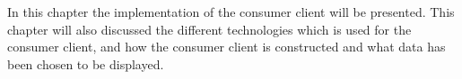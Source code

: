 In this chapter the implementation of the consumer client will be presented.
This chapter will also discussed the different technologies which is used for the consumer client, and how the consumer client is constructed and what data has been chosen to be displayed.
